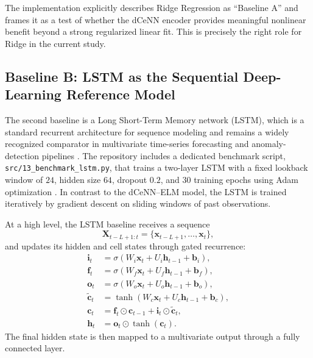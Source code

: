 The implementation explicitly describes Ridge Regression as ``Baseline A'' and frames it as a test of whether the dCeNN encoder provides meaningful nonlinear benefit beyond a strong regularized linear fit. This is precisely the right role for Ridge in the current study.

\subsection{Baseline B: LSTM as the Sequential Deep-Learning Reference Model}

The second baseline is a Long Short-Term Memory network (LSTM), which is a standard recurrent architecture for sequence modeling and remains a widely recognized comparator in multivariate time-series forecasting and anomaly-detection pipelines \cite{hochreiter1997long}. The repository includes a dedicated benchmark script, \texttt{src/13\_benchmark\_lstm.py}, that trains a two-layer LSTM with a fixed lookback window of $24$, hidden size $64$, dropout $0.2$, and $30$ training epochs using Adam optimization \cite{repo_thesis_grid_anomaly}. In contrast to the dCeNN--ELM model, the LSTM is trained iteratively by gradient descent on sliding windows of past observations.

At a high level, the LSTM baseline receives a sequence
\begin{equation}
	\mathbf{X}_{t-L+1:t} = \{\mathbf{x}_{t-L+1}, \dots, \mathbf{x}_{t}\},
	\label{eq:lstm_sequence}
\end{equation}
and updates its hidden and cell states through gated recurrence:
\begin{align}
	\mathbf{i}_t &= \sigma(W_i \mathbf{x}_t + U_i \mathbf{h}_{t-1} + \mathbf{b}_i), \\
	\mathbf{f}_t &= \sigma(W_f \mathbf{x}_t + U_f \mathbf{h}_{t-1} + \mathbf{b}_f), \\
	\mathbf{o}_t &= \sigma(W_o \mathbf{x}_t + U_o \mathbf{h}_{t-1} + \mathbf{b}_o), \\
	\tilde{\mathbf{c}}_t &= \tanh(W_c \mathbf{x}_t + U_c \mathbf{h}_{t-1} + \mathbf{b}_c), \\
	\mathbf{c}_t &= \mathbf{f}_t \odot \mathbf{c}_{t-1} + \mathbf{i}_t \odot \tilde{\mathbf{c}}_t, \\
	\mathbf{h}_t &= \mathbf{o}_t \odot \tanh(\mathbf{c}_t).
	\label{eq:lstm_baseline}
\end{align}
The final hidden state is then mapped to a multivariate output through a fully connected layer.

